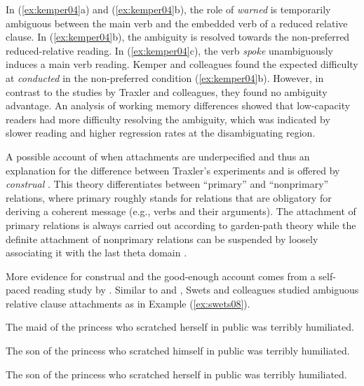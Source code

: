 \documentclass{cambridge7A}\usepackage[]{graphicx}\usepackage[]{color}
\begin{document}
In (\ref{ex:kemper04}a) and (\ref{ex:kemper04}b), the role of \textit{warned} is temporarily ambiguous between the main verb and the embedded verb of a reduced relative clause. In (\ref{ex:kemper04}b), the ambiguity is resolved towards the non-preferred reduced-relative reading. In (\ref{ex:kemper04}c), the verb \textit{spoke} unambiguously induces a main verb reading. Kemper and colleagues found the expected difficulty at \textit{conducted} in the non-preferred condition (\ref{ex:kemper04}b). However, in contrast to the studies by Traxler and colleagues, they found no ambiguity advantage. An analysis of working memory differences showed that low-capacity readers had more difficulty resolving the ambiguity, which was indicated by slower reading and higher regression rates at the disambiguating region.

A possible account of when attachments are underpecified and thus an explanation for the difference between Traxler's experiments and \cite{KemperCrowKemtes2004} is offered by  \emph{construal} \citep{CarreirasClifton1993,FrazierClifton1997}. This theory differentiates between  ``primary'' and ``nonprimary'' relations, where primary roughly stands for relations that are obligatory for deriving a coherent message (e.g., verbs and their arguments). The attachment of primary relations is always carried out according to garden-path theory \citep{Frazier1987} while the definite attachment of nonprimary relations can be suspended by loosely associating it with the last theta domain \citep{FrazierClifton1997}.

More evidence for construal and the good-enough account \citep{FerreiraFerraroBailey2002,SanfordSturt2002} comes from a self-paced reading study by \cite{SwetsDesmetClifton2008}. Similar to \cite{TraxlerPickeringClifton1998} and \cite{Traxler2007}, Swets and colleagues studied ambiguous relative clause attachments as in Example (\ref{ex:swets08}).

\begin{exe}
\ex\label{ex:swets08}
\begin{xlist}
\item The maid of the princess who scratched herself in public was terribly humiliated.
\item The son of the princess who scratched himself in public was terribly humiliated.
\item The son of the princess who scratched herself in public was terribly humiliated.
\end{xlist}
\end{exe}
\end{document}
